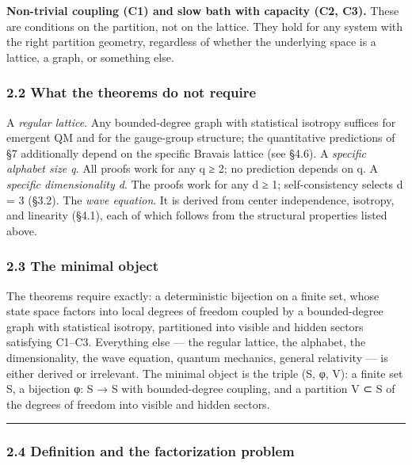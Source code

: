 \documentclass[
]{article}
\begin{document}
\textbf{Non-trivial coupling (C1) and slow bath with capacity (C2, C3).}
These are conditions on the partition, not on the lattice. They hold for
any system with the right partition geometry, regardless of whether the
underlying space is a lattice, a graph, or something else.

\hypertarget{what-the-theorems-do-not-require}{%
\subsubsection{2.2 What the theorems do not
require}\label{what-the-theorems-do-not-require}}

A \emph{regular lattice}. Any bounded-degree graph with statistical
isotropy suffices for emergent QM and for the gauge-group structure; the
quantitative predictions of §7 additionally depend on the specific
Bravais lattice (see §4.6). A \emph{specific alphabet size q}. All
proofs work for any q ≥ 2; no prediction depends on q. A \emph{specific
dimensionality d}. The proofs work for any d ≥ 1; self-consistency
selects d = 3 (§3.2). The \emph{wave equation}. It is derived from
center independence, isotropy, and linearity (§4.1), each of which
follows from the structural properties listed above.

\hypertarget{the-minimal-object}{%
\subsubsection{2.3 The minimal object}\label{the-minimal-object}}

The theorems require exactly: a deterministic bijection on a finite set,
whose state space factors into local degrees of freedom coupled by a
bounded-degree graph with statistical isotropy, partitioned into visible
and hidden sectors satisfying C1--C3. Everything else --- the regular
lattice, the alphabet, the dimensionality, the wave equation, quantum
mechanics, general relativity --- is either derived or irrelevant. The
minimal object is the triple (S, φ, V): a finite set S, a bijection φ: S
→ S with bounded-degree coupling, and a partition V ⊂ S of the degrees
of freedom into visible and hidden sectors.

\begin{center}\rule{0.5\linewidth}{0.5pt}\end{center}

\hypertarget{definition-and-the-factorization-problem}{%
\subsubsection{2.4 Definition and the factorization
problem}\label{definition-and-the-factorization-problem}}
\end{document}
